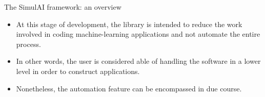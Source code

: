 \documentclass[11pt]{beamer}
\begin{document}
\begin{frame}{The SimulAI framework: an overview}

\begin{itemize} 
	\item At this stage of development, the library is intended to reduce the work involved in coding machine-learning applications and not automate the entire process.
	\item In other words, the user is considered able of handling the software in a lower level in order to construct applications. 
	\item  Nonetheless, the automation feature can be encompassed in due course.
\end{itemize}	
	 
\end{frame}
\end{document}
